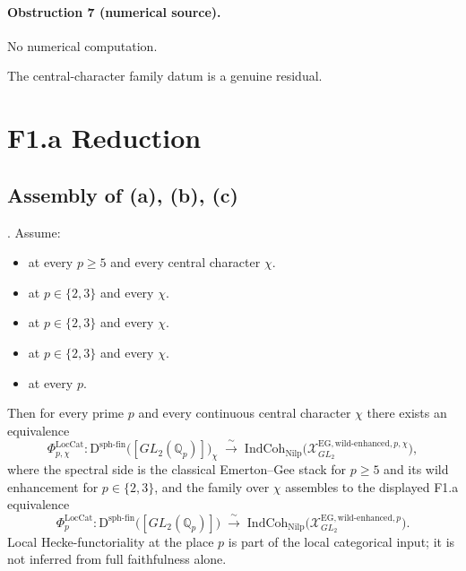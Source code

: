 \paragraph{Obstruction 7 (numerical source).} No numerical computation.

The central-character family datum is a genuine residual.

\section{F1.a Reduction}
\label{v4-arith:deg-f1a:reduction}

\subsection{Assembly of (a), (b), (c)}

\begin{theorem}
\label{v4-arith:deg-f1a:thm:F1a-conditional}
\ClaimStatusProvedHereConditional. Assume:
\begin{itemize}
\item[\textbf{(H1)}] 
at every \(p\geq 5\) and every central character \(\chi\).
\item[\textbf{(H2)}] 
at \(p\in\{2,3\}\) and every \(\chi\).
\item[\textbf{(H3)}] 
at \(p\in\{2,3\}\) and every \(\chi\).
\item[\textbf{(H4)}] 
at \(p\in\{2,3\}\) and every \(\chi\).
\item[\textbf{(H5)}] 
at every \(p\).
\end{itemize}
Then for every prime \(p\) and every continuous central character
\(\chi\) there exists an equivalence
\begin{equation}
\label{v4-arith:deg-f1a:eq:F1a-conditional}
\Phi^{\mathrm{LocCat}}_{p,\chi}\colon\mathrm{D}^{\mathrm{sph\text{-}fin}}\bigl([GL_{2}(\mathbb{Q}_{p})]\bigr)_{\chi}
\;\xrightarrow{\;\sim\;}\;\mathrm{IndCoh}_{\mathrm{Nilp}}\bigl(\mathcal{X}^{\mathrm{EG,wild\text{-}enhanced},p,\chi}_{GL_{2}}\bigr),
\end{equation}
where the spectral side is the classical Emerton--Gee stack for
\(p\geq 5\) and its wild enhancement for \(p\in\{2,3\}\), and the
family over \(\chi\) assembles to the displayed F1.a equivalence
\begin{equation}
\label{v4-arith:deg-f1a:eq:F1a-displayed}
\Phi^{\mathrm{LocCat}}_{p}\colon\mathrm{D}^{\mathrm{sph\text{-}fin}}\bigl([GL_{2}(\mathbb{Q}_{p})]\bigr)
\;\xrightarrow{\;\sim\;}\;\mathrm{IndCoh}_{\mathrm{Nilp}}\bigl(\mathcal{X}^{\mathrm{EG,wild\text{-}enhanced},p}_{GL_{2}}\bigr).
\end{equation}
Local Hecke-functoriality at the place \(p\) is part of the local
categorical input; it is not inferred from full faithfulness alone.
\end{theorem}

